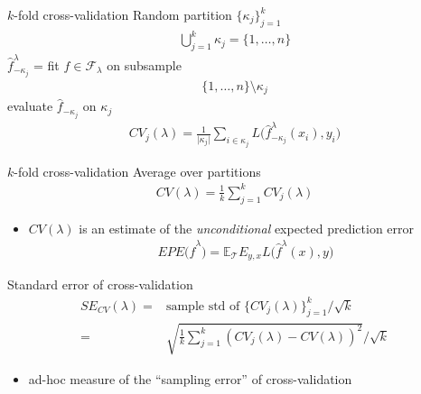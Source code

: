 \documentclass[xcolor=dvipsnames]{beamer}
\newcommand{\E}{\mathbb{E}}
\begin{document}
\begin{frame}{$k$-fold cross-validation}
Random partition $\{\kappa_j\}_{j = 1}^k$
\begin{align*}
\bigcup_{j = 1}^k \kappa_j = \{1, \dotsc, n\}
\end{align*}
$\hat{f}^{\lambda}_{-\kappa_j}$ = fit $f \in \mathcal{F}_{\lambda}$ on subsample 
\begin{align*}
  \{1, \dotsc, n\} \setminus \kappa_j
\end{align*}
evaluate $\hat{f}_{-\kappa_j}$ on $\kappa_j$
\begin{align*}
  CV_j(\lambda) = \frac{1}{\lvert\kappa_j\rvert} \sum_{i \in \kappa_j} L\big(\hat{f}^{\lambda}_{-\kappa_j}(x_i), y_i \big)
\end{align*}
\end{frame}

\begin{frame}{$k$-fold cross-validation}
Average over partitions
\begin{align*}
  CV(\lambda) = \frac{1}{k} \sum_{j=1}^k CV_j(\lambda)
\end{align*}
\pause
\begin{itemize}
  \item $CV(\lambda)$ is an estimate of the \emph{unconditional} expected prediction error
    \begin{align*}
    EPE \big(\hat{f}^{\lambda}\big) = \E_{\mathcal{T}} E_{y, x} L \big(\hat{f}^{\lambda}(x), y \big)
  \end{align*}
\end{itemize}
\end{frame}

\begin{frame}{Standard error of cross-validation}
\begin{align*}
  SE_{CV}(\lambda) =& \text{sample std of $\{CV_j(\lambda)\}_{j=1}^k$}/{\sqrt{k}}
\\
  =& \sqrt{\frac{1}{k} \sum_{j=1}^k\left( CV_j(\lambda) - CV(\lambda)\right)^2}/\sqrt{k}
\end{align*}
\begin{itemize}
  \item ad-hoc measure of the ``sampling error'' of cross-validation
\end{itemize}
\end{frame}
\end{document}
